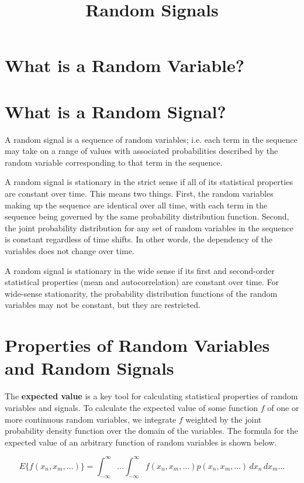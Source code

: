 \documentclass{article}
\title{Random Signals}
\date{}
\begin{document}
	
	\maketitle
	
	\section{What is a Random Variable?}
	
	\section{What is a Random Signal?}
	A random signal is a sequence of random variables; i.e. each term in the sequence may take on a range of values with associated probabilities described by the random variable corresponding to that term in the sequence.
	
	A random signal is stationary in the strict sense if all of its statistical properties are constant over time. This means two things. First, the random variables making up the sequence are identical over all time, with each term in the sequence being governed by the same probability distribution function. Second, the joint probability distribution for any set of random variables in the sequence is constant regardless of time shifts. In other words, the dependency of the variables does not change over time.
	
	A random signal is stationary in the wide sense if its first and second-order statistical properties (mean and autocorrelation) are constant over time. For wide-sense stationarity, the probability distribution functions of the random variables may not be constant, but they are restricted.
	
	\section{Properties of Random Variables and Random Signals}
	The \textbf{expected value} is a key tool for calculating statistical properties of random variables and signals. To calculate the expected value of some function $f$ of one or more continuous random variables, we integrate $f$ weighted by the joint probability density function over the domain of the variables. The formula for the expected value of an arbitrary function of random variables is shown below.
	
	\begin{equation}
		E\{f(x_n, x_m, \dots)\} = \int_{-\infty}^{\infty} \dots \int_{-\infty}^{\infty} f(x_n, x_m, \dots) p(x_n, x_m, \dots) \, dx_n \, dx_m \dots
	\end{equation}
	
\end{document}
